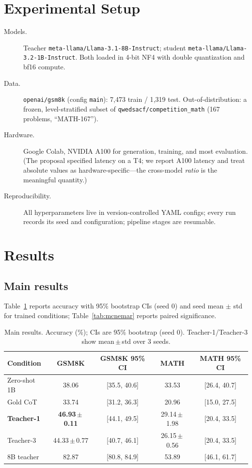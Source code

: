 \documentclass[11pt]{article}
\begin{document}
\section{Experimental Setup}
\begin{description}
  \item[Models.] Teacher \texttt{meta-llama/Llama-3.1-8B-Instruct}; student
  \texttt{meta-llama/Llama-3.2-1B-Instruct}. Both loaded in 4-bit NF4 with double
  quantization and bf16 compute.
  \item[Data.] \texttt{openai/gsm8k} (config \texttt{main}): 7{,}473 train /
  1{,}319 test. Out-of-distribution: a frozen, level-stratified subset of
  \texttt{qwedsacf/competition\_math} (167 problems, ``MATH-167'').
  \item[Hardware.] Google Colab, NVIDIA A100 for generation, training, and most
  evaluation. (The proposal specified latency on a T4; we report A100 latency and
  treat absolute values as hardware-specific---the cross-model \emph{ratio} is the
  meaningful quantity.)
  \item[Reproducibility.] All hyperparameters live in version-controlled YAML
  configs; every run records its seed and configuration; pipeline stages are
  resumable.
\end{description}

\section{Results}
\subsection{Main results}
Table~\ref{tab:main} reports accuracy with 95\% bootstrap CIs (seed 0) and seed
mean $\pm$ std for trained conditions; Table~\ref{tab:mcnemar} reports paired
significance.

\begin{table}[H]
\centering
\caption{Main results. Accuracy (\%); CIs are 95\% bootstrap (seed 0).
Teacher-1/Teacher-3 show mean\,$\pm$\,std over 3 seeds.}
\label{tab:main}
\begin{tabular}{lcccc}
\toprule
Condition & GSM8K & GSM8K 95\% CI & MATH & MATH 95\% CI \\
\midrule
Zero-shot 1B        & 38.06            & [35.5, 40.6] & 33.53            & [26.4, 40.7] \\
Gold CoT            & 33.74            & [31.2, 36.3] & 20.96            & [15.0, 27.5] \\
\textbf{Teacher-1}  & \textbf{46.93\,$\pm$\,0.11} & [44.1, 49.5] & 29.14\,$\pm$\,1.98 & [20.4, 33.5] \\
Teacher-3           & 44.33\,$\pm$\,0.77 & [40.7, 46.1] & 26.15\,$\pm$\,0.56 & [20.4, 33.5] \\
8B teacher          & 82.87            & [80.8, 84.9] & 53.89            & [46.1, 61.7] \\
\bottomrule
\end{tabular}
\end{table}
\end{document}
